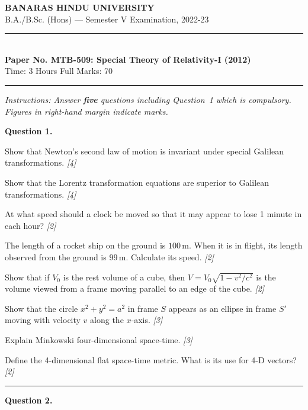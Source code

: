 \documentclass[11pt,a4paper]{article}
\newcommand{\pts}[1]{\hfill   \textit{[#1]}}
\begin{document}
\begin{center}
  {\large\bfseries BANARAS HINDU UNIVERSITY}\\[2pt]
  {\normalsize B.A./B.Sc. (Hons) --- Semester V Examination, 2022-23}\\[6pt]
  \rule{0.8\linewidth}{0.5pt}\\[6pt]
  {\large\bfseries Paper No. MTB-509: Special Theory of Relativity-I (2012)}\\[4pt]
  {\normalsize Time: 3 Hours \hfill Full Marks: 70}
\end{center}
\rule{\linewidth}{0.4pt}
\smallskip



\noindent   \textit{Instructions: Answer   \textbf{five} questions including Question~1 which is compulsory. Figures in right-hand margin indicate marks.}
\bigskip




\noindent   \textbf{Question 1.}

\begin{parts}
  \item Show that Newton's second law of motion is invariant under special Galilean transformations. \pts{4}
  \item Show that the Lorentz transformation equations are superior to Galilean transformations. \pts{4}
  \item At what speed should a clock be moved so that it may appear to lose 1 minute in each hour? \pts{2}
  \item The length of a rocket ship on the ground is $100\, \text{m}$. When it is in flight, its length observed from the ground is $99\, \text{m}$. Calculate its speed. \pts{2}
  \item Show that if $V_0$ is the rest volume of a cube, then $V = V_0\sqrt{1 - v^2/c^2}$ is the volume viewed from a frame moving parallel to an edge of the cube. \pts{2}
  \item Show that the circle $x^2 + y^2 = a^2$ in frame $S$ appears as an ellipse in frame $S'$ moving with velocity $v$ along the $x$-axis. \pts{3}
  \item Explain Minkowski four-dimensional space-time. \pts{3}
  \item Define the 4-dimensional flat space-time metric. What is its use for 4-D vectors? \pts{2}
\end{parts}

\medskip\rule{\linewidth}{0.2pt}

\medskip


\noindent   \textbf{Question 2.}
\end{document}
